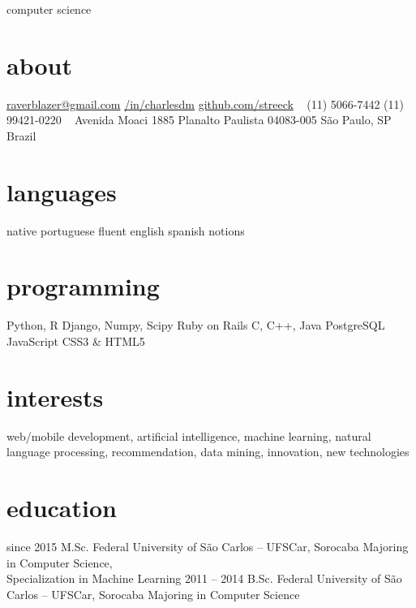 \documentclass[]{friggeri-cv}
\begin{document}
       {computer science}


\begin{aside}
  \section{about}
    \href{mailto:raverblazer@gmail.com}{raverblazer@gmail.com}
    \href{http://www.linkedin.com/in/charlesdm}{\faLinkedinSign \space  /in/charlesdm}
    \href{https://github.com/streeck}{\faGithubSign \space github.com/streeck}
    ~
    (11) 5066-7442
    (11) 99421-0220
    ~
    Avenida Moaci 1885
    Planalto Paulista
    04083-005
    São Paulo, SP
    Brazil
  \section{languages}
    native portuguese
    fluent english
    spanish notions
  \section{programming}
    Python, R
    Django, Numpy, Scipy
    Ruby on Rails
    C, C++, Java
    PostgreSQL
    JavaScript
    CSS3 \& HTML5
\end{aside}

\section{interests}

web/mobile development, artificial intelligence, machine learning, natural language processing, recommendation, data mining, innovation, new technologies

\section{education}

\begin{entrylist}
  \entry
    {since 2015}
    {M.Sc.}
    {Federal University of São Carlos -- UFSCar, Sorocaba}
    {Majoring in Computer Science,\\
    Specialization in Machine Learning}
  \entry
    {2011 – 2014}
    {B.Sc.}
    {Federal University of São Carlos -- UFSCar, Sorocaba}
    {Majoring in Computer Science}
\end{entrylist}
\end{document}
